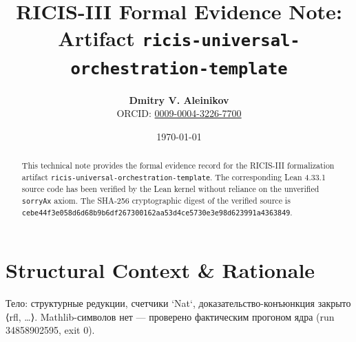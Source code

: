\documentclass[11pt,a4paper]{article}
\title{\textbf{RICIS-III Formal Evidence Note:\\Artifact \texttt{ricis-universal-orchestration-template}}}
\author{\textbf{Dmitry V. Aleinikov}\\ORCID: \href{https://orcid.org/0009-0004-3226-7700}{0009-0004-3226-7700}}
\date{\today}
\begin{document}
\maketitle

\begin{abstract}
This technical note provides the formal evidence record for the RICIS-III formalization artifact \texttt{ricis-universal-orchestration-template}.
The corresponding Lean 4.33.1 source code has been verified by the Lean kernel without reliance on the unverified \texttt{sorryAx} axiom.
The SHA-256 cryptographic digest of the verified source is \texttt{cebe44f3e058d6d68b9b6df267300162aa53d4ce5730e3e98d623991a4363849}.
\end{abstract}

\section{Structural Context & Rationale}
Тело: структурные редукции, счетчики `Nat`, доказательство-конъюнкция закрыто ⟨rfl, …⟩. Mathlib-символов нет — проверено фактическим прогоном ядра (run 34858902595, exit 0).
\end{document}
